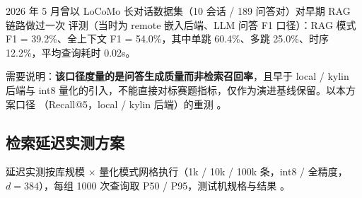 2026 年 5 月曾以 LoCoMo 长对话数据集（10 会话 / 189 问答对）对早期 RAG 链路做过一次
评测（当时为 remote 嵌入后端、LLM 问答 F1 口径）：RAG 模式 F1 = 39.2\%、全上下文
F1 = 54.0\%，其中单跳 60.4\%、多跳 25.0\%、时序 12.2\%，平均查询耗时 0.02s。

需要说明：\textbf{该口径度量的是问答生成质量而非检索召回率}，且早于 local / kylin
后端与 int8 量化的引入，不能直接对标赛题指标，仅作为演进基线保留。以本方案口径
（Recall@5，local / kylin 后端）的重测 。

\subsection{检索延迟实测方案}

延迟实测按库规模 $\times$ 量化模式网格执行（1k / 10k / 100k 条，int8 / 全精度，
$d=384$），每组 1000 次查询取 P50 / P95，测试机规格与结果
。
